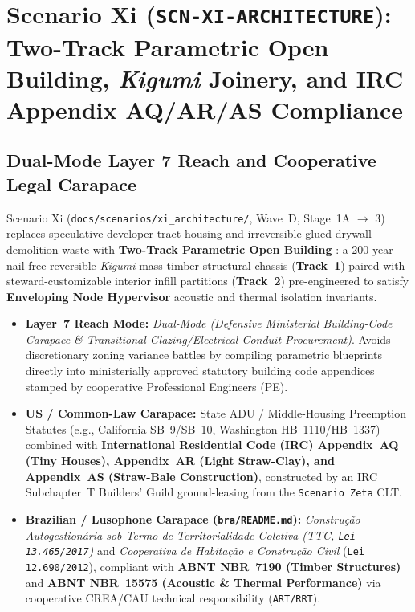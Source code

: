 \chapter{Scenario Xi (\texttt{SCN-XI-ARCHITECTURE}): Two-Track Parametric Open Building, \textit{Kigumi} Joinery, and IRC Appendix AQ/AR/AS Compliance}
\label{app:scenario-xi}

\section{Dual-Mode Layer 7 Reach and Cooperative Legal Carapace}
Scenario Xi (\texttt{docs/scenarios/xi\_architecture/}, Wave~D, Stage~1A $\to$ 3) replaces speculative developer tract housing and irreversible glued-drywall demolition waste with \textbf{Two-Track Parametric Open Building} \parencite{habraken1972supports,brand1994buildings}: a 200-year nail-free reversible \textit{Kigumi} mass-timber structural chassis (\textbf{Track~1}) paired with steward-customizable interior infill partitions (\textbf{Track~2}) pre-engineered to satisfy \textbf{Enveloping Node Hypervisor} acoustic and thermal isolation invariants.
\begin{itemize}
    \item \textbf{Layer~7 Reach Mode:} \textit{Dual-Mode (Defensive Ministerial Building-Code Carapace \& Transitional Glazing/Electrical Conduit Procurement)}. Avoids discretionary zoning variance battles by compiling parametric blueprints directly into ministerially approved statutory building code appendices stamped by cooperative Professional Engineers (PE).
    \item \textbf{US / Common-Law Carapace:} State ADU / Middle-Housing Preemption Statutes (e.g., California SB~9/SB~10, Washington HB~1110/HB~1337) combined with \textbf{International Residential Code (IRC) Appendix~AQ (Tiny Houses), Appendix~AR (Light Straw-Clay), and Appendix~AS (Straw-Bale Construction)}, constructed by an IRC Subchapter~T Builders' Guild ground-leasing from the \texttt{Scenario Zeta} CLT.
    \item \textbf{Brazilian / Lusophone Carapace (\texttt{bra/README.md}):} \textit{Constru{\c{c}}{\~a}o Autogestion{\'a}ria sob Termo de Territorialidade Coletiva (TTC, \texttt{Lei 13.465/2017})} and \textit{Cooperativa de Habita{\c{c}}{\~a}o e Constru{\c{c}}{\~a}o Civil} (\texttt{Lei 12.690/2012}), compliant with \textbf{ABNT NBR~7190 (Timber Structures)} and \textbf{ABNT NBR~15575 (Acoustic \& Thermal Performance)} via cooperative CREA/CAU technical responsibility (\texttt{ART/RRT}).
\end{itemize}

